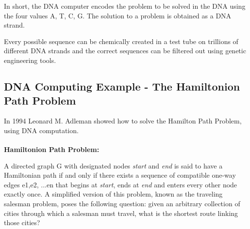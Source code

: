     In short, the DNA computer encodes the problem to be solved in the DNA using the four values A, T, C, G. The solution to a problem is obtained as a DNA strand.
    
    Every  possible  sequence  can  be  chemically  created  in  a  test  tube  on trillions  of different  DNA strands and  the  correct  sequences  can  be filtered out using genetic engineering tools.
    
\subsection{DNA Computing Example - The Hamiltonion Path Problem}

In  1994  Leonard  M.  Adleman showed  how  to  solve  the  Hamilton  Path Problem, using DNA computation.
\\ \\
\textbf{Hamiltonion Path Problem:}

A directed graph G with designated nodes \textit{start} and \textit{end} is said to have a Hamiltonian  path  if  and  only  if  there  exists  a  sequence  of  compatible one-way  edges e1,e2,  ...en that  begins  at \textit{start},  ends  at \textit{end} and  enters every  other  node  exactly  once.  A  simplified  version  of  this  problem, known  as  the  traveling  salesman  problem,  poses  the  following  question: given  an  arbitrary  collection  of  cities  through  which  a  salesman  must travel, what is the shortest route linking those cities?

